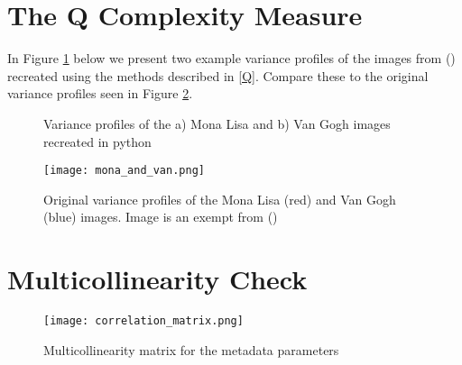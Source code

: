 \documentclass[12pt]{article}
\begin{document}
\clearpage

\appendix
\section{The Q Complexity Measure}\label{A1}
In Figure \ref{fig:Qrecreated} below we present two example variance profiles of the images from (\cite{zanetteQuantifyingComplexityBlackandwhite2018}) recreated using the methods described in \ref{Q}. Compare these to the original variance profiles seen in Figure \ref{fig:monalisa}.

\begin{figure}[h]
	\centering
	\hfill
	\caption{Variance profiles of the a) Mona Lisa and b) Van Gogh images recreated in python} 
	\label{fig:Qrecreated}
\end{figure}

\begin{figure}[h]
	\begin{center}
		\texttt{[image: mona\_and\_van.png]}
	\end{center}
	\caption{Original variance profiles of the Mona Lisa (red) and Van Gogh (blue) images. Image is an exempt from (\cite{zanetteQuantifyingComplexityBlackandwhite2018})}
	\label{fig:monalisa}
\end{figure}


\section{Multicollinearity Check}\label{A2}

\begin{sidewaysfigure}
    \centering
	\begin{center}
		\texttt{[image: correlation\_matrix.png]}
	\end{center}
	\caption{Multicollinearity matrix for the metadata parameters}
	\label{fig:multicol}
\end{sidewaysfigure}
\end{document}
